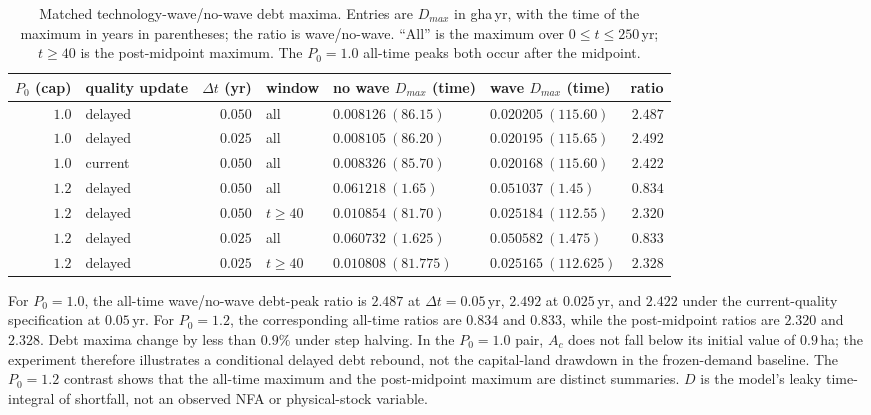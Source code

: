 \documentclass[11pt,a4paper]{article}
\begin{document}
\begin{table}[htbp]
\centering\small
\caption{Matched technology-wave/no-wave debt maxima. Entries are $D_{max}$ in gha\,yr, with the time of the maximum in years in parentheses; the ratio is wave/no-wave. ``All'' is the maximum over $0\le t\le250$\,yr; $t\ge40$ is the post-midpoint maximum. The $P_0=1.0$ all-time peaks both occur after the midpoint.}
\label{tab:si_wave_debt}
\begin{tabularx}{\textwidth}{r l r l >{\centering\arraybackslash}X >{\centering\arraybackslash}X r}
\toprule
$P_0$ (cap) & quality update & $\Delta t$ (yr) & window & no wave $D_{max}$ (time) & wave $D_{max}$ (time) & ratio \\
\midrule
$1.0$ & delayed & $0.050$ & all & $0.008126\ (86.15)$ & $0.020205\ (115.60)$ & $2.487$ \\
$1.0$ & delayed & $0.025$ & all & $0.008105\ (86.20)$ & $0.020195\ (115.65)$ & $2.492$ \\
$1.0$ & current & $0.050$ & all & $0.008326\ (85.70)$ & $0.020168\ (115.60)$ & $2.422$ \\
$1.2$ & delayed & $0.050$ & all & $0.061218\ (1.65)$ & $0.051037\ (1.45)$ & $0.834$ \\
$1.2$ & delayed & $0.050$ & $t\ge40$ & $0.010854\ (81.70)$ & $0.025184\ (112.55)$ & $2.320$ \\
$1.2$ & delayed & $0.025$ & all & $0.060732\ (1.625)$ & $0.050582\ (1.475)$ & $0.833$ \\
$1.2$ & delayed & $0.025$ & $t\ge40$ & $0.010808\ (81.775)$ & $0.025165\ (112.625)$ & $2.328$ \\
\bottomrule
\end{tabularx}
\end{table}

For $P_0=1.0$, the all-time wave/no-wave debt-peak ratio is $2.487$ at $\Delta t=0.05$\,yr, $2.492$ at $0.025$\,yr, and $2.422$ under the current-quality specification at $0.05$\,yr. For $P_0=1.2$, the corresponding all-time ratios are $0.834$ and $0.833$, while the post-midpoint ratios are $2.320$ and $2.328$. Debt maxima change by less than $0.9\%$ under step halving. In the $P_0=1.0$ pair, $A_c$ does not fall below its initial value of $0.9$\,ha; the experiment therefore illustrates a conditional delayed debt rebound, not the capital-land drawdown in the frozen-demand baseline. The $P_0=1.2$ contrast shows that the all-time maximum and the post-midpoint maximum are distinct summaries. $D$ is the model's leaky time-integral of shortfall, not an observed NFA or physical-stock variable.
\end{document}

